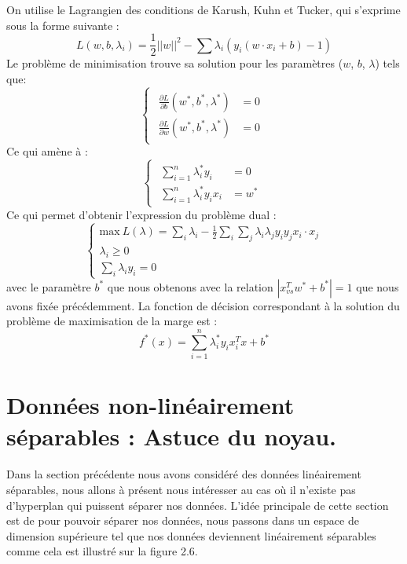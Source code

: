 \documentclass[a4paper,12pt,titlepage]{report}
\begin{document}
On utilise le Lagrangien des conditions de Karush, Kuhn et Tucker, qui s'exprime sous la forme suivante :
\[
L(w,b,\lambda_{i}) = \frac{1}{2}||w||^{2} - \sum{\lambda_{i}( y_i (w \cdot x_i + b)-1)}
\]
Le problème de minimisation trouve sa solution pour les paramètres ($w$, $b$, $\lambda$) tels que: 
\[
\left\{
	\begin{array}{cc}		
	\begin{aligned}
		\frac{\partial L}{\partial b}(w^*, b^* , \lambda^*) &= 0\\
		\frac{\partial L}{\partial w}(w^*, b^* , \lambda^*) &= 0
	\end{aligned}
\end{array}
	\right.
\]
Ce qui amène à :
\[
\left\{
	\begin{array}{cc}		
	\begin{aligned}
		\sum_{i=1}^{n}{\lambda^{*}_i y_i} &= 0\\
		\sum_{i=1}^{n}{\lambda^{*}_i y_i x_i} &= w^*
	\end{aligned}
\end{array}
	\right.
\]
Ce qui permet d'obtenir l'expression du problème dual :
\[
\left\{
\begin{array}{lll}
	\text{max}\ L(\lambda) = \sum_{i}{\lambda_{i}} - \frac{1}{2} \sum_{i}{\sum_{j}	{\lambda_{i} \lambda_{j} y_i y_j x_i \cdot x_j}} \\
 \lambda_i \geqslant 0 \\
 \sum_{i}\lambda_i y_i = 0 
\end{array}
\right.
\]
avec le paramètre $b^*$ que nous obtenons avec la relation $|x_{vs}^T w^*  + b^*| = 1$ que nous avons fixée précédemment.
La fonction de décision correspondant à la solution du problème de maximisation de la marge est :
\[
	f^* (x) = \sum_{i=1}^n {\lambda^*_i y_i x^T_i x + b^*}
\]

\section{Données non-linéairement séparables : Astuce du noyau.}
\paragraph{}
Dans la section précédente nous avons considéré des données linéairement séparables,
nous allons à présent nous intéresser au cas où il n'existe pas d'hyperplan qui puissent séparer nos données. L'idée principale de cette section est de pour pouvoir séparer nos données, nous passons dans un espace de dimension supérieure tel que nos données deviennent linéairement séparables comme cela est illustré sur la figure 2.6.
\end{document}
